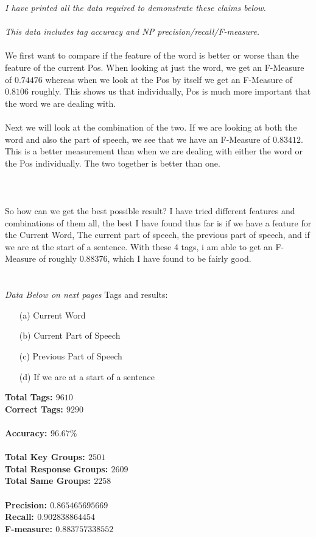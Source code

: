 


\large{\textit{I have printed all the data required to demonstrate these claims below.}} \\\\   
\large{\textit{This data includes tag accuracy and NP precision/recall/F-measure.}} \\\\   
We first want to compare if the feature of the word is better or worse than the feature of the current Pos.  When looking at just the word, we get an F-Measure of $0.74476$ whereas when we look at the Pos by itself we get an F-Measure of $0.8106$ roughly.  This shows us that individually, Pos is much more important that the word we are dealing with.
\\ \\
Next we will look at the combination of the two.  If we are looking at both the word and also the part of speech, we see that we have an F-Measure of $0.83412$.  This is a better measurement than when we are dealing with either the word or the Pos individually.  The two together is better than one.  \\ \\
\\ \\
So how can we get the best possible result?  I have tried different features and combinations of them all, the best I have found thus far is if we have a feature for the Current Word, The current part of speech, the previous part of speech, and if we are at the start of a sentence. With these 4 tags, i am able to get an F-Measure of roughly 0.88376, which I have found to be fairly good.  
\\ \\ \\
\large{\textit{Data Below on next pages}}
\newpage
Tags and results:
\begin{itemize}
\item[(a)] Current Word
\item[(b)] Current Part of Speech
\item[(c)] Previous Part of Speech
\item[(d)] If we are at a start of a sentence
\end{itemize}
\large{
\textbf{Total Tags: $9610$} \\
\textbf{Correct Tags: $9290$} \\
\\
\textbf{Accuracy: $96.67\%$} \\
\\
\textbf{Total Key Groups: $2501$} \\
\textbf{Total Response Groups: $2609$} \\
\textbf{Total Same Groups: $2258$} \\
\\
\textbf{Precision: $0.865465695669$} \\
\textbf{Recall: $0.902838864454$} \\
\textbf{F-measure: $0.883757338552$} \\
}

